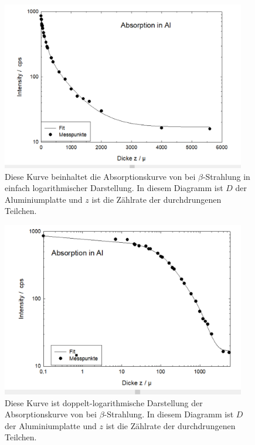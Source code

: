 \documentclass[12pt,english,ngerman]{scrartcl}
\begin{document}
\begin{figure}[H]
  \begin{center}
    \includegraphics[width = 0.95\textwidth]{figures/aluminiumabsorbtion.png}
  \end{center}
  \caption[Absorptionskurve von  bei $\beta$-Strahlung]{
    Diese Kurve beinhaltet die Absorptionskurve von  bei
    $\beta$-Strahlung in einfach logarithmischer Darstellung.
    In diesem Diagramm ist $D$ der Aluminiumplatte und
    $z$ ist die Zählrate der durchdrungenen Teilchen.
  }
  \label{fig:alu_absorption}
\end{figure}

\begin{figure}[H]
  \begin{center}
    \includegraphics[width = 0.95\textwidth]{figures/aluminiumdoppellog.png}
  \end{center}
  \caption[Doppelt-logarithmsche Darstellung der Absorptionskurve von 
  bei $beta$-Strahlung]{
    Diese Kurve ist doppelt-logarithmische Darstellung der Absorptionskurve von
     bei $\beta$-Strahlung. In diesem Diagramm ist $D$ der
    Aluminiumplatte und $z$ ist die Zählrate der durchdrungenen Teilchen.
  }
  \label{fig:alu_doppellog}
\end{figure}
\end{document}
